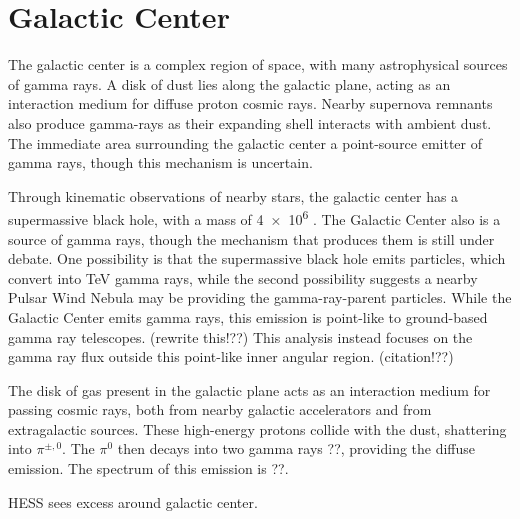 \section{Galactic Center}
  The galactic center is a complex region of space, with many astrophysical sources of gamma rays.
  A disk of dust lies along the galactic plane, acting as an interaction medium for diffuse proton cosmic rays.
  Nearby supernova remnants also produce gamma-rays as their expanding shell interacts with ambient dust.
  The immediate area surrounding the galactic center a point-source emitter of gamma rays, though this mechanism is uncertain.

  Through kinematic observations of nearby stars, the galactic center has a supermassive black hole, with a mass of \SI{4e6}{\Msol} \cite{sgra_massdist}.
  The Galactic Center also is a source of \TeV{} gamma rays, though the mechanism that produces them is still under debate.
  One possibility is that the supermassive black hole emits particles, which convert into TeV gamma rays, while the second possibility suggests a nearby Pulsar Wind Nebula may be providing the gamma-ray-parent particles.
  While the Galactic Center emits gamma rays, this emission is point-like to ground-based gamma ray telescopes. {\color{red}(rewrite this!??)}
  This analysis instead focuses on the gamma ray flux outside this point-like inner angular region. {\color{red}(citation!??)}

  The disk of gas present in the galactic plane acts as an interaction medium for passing cosmic rays, both from nearby galactic accelerators and from extragalactic sources.
  These high-energy protons collide with the dust, shattering into $\pi^{\pm,0}$.
  The $\pi^0$ then decays into two gamma rays {\color{red}??}, providing the diffuse emission.
  The spectrum of this emission is {\color{red}??}.

  HESS sees excess around galactic center.


